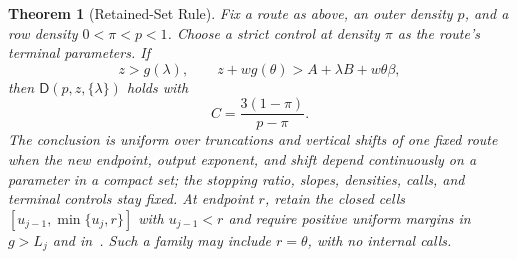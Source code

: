 \documentclass[10pt,a4paper]{amsart}
\newtheorem{theorem}{Theorem}
\newcommand{\DD}{\mathsf D}
\begin{document}
\begin{theorem}[Retained-Set Rule]\label{thm:route}
Fix a route as above, an outer density $p$, and a row density $0<\pi<p<1$.
Choose a strict control at density $\pi$ as the route's \emph{terminal parameters}.
If
\begin{equation}\label{eq:route-test}
 z>g(\lambda),\qquad
 z+w g(\theta)>A+\lambda B+w\theta\beta,
\end{equation}
then $\DD(p,z,\{\lambda\})$ holds with
\begin{equation}\label{eq:C}
 C=\frac{3(1-\pi)}{p-\pi}.
\end{equation}
The conclusion is uniform over truncations and vertical shifts of one fixed route when the new endpoint, output exponent, and shift depend continuously on a parameter in a compact set; the stopping ratio, slopes, densities, calls, and terminal controls stay fixed.
At endpoint $r$, retain the closed cells $[u_{j-1},\min\{u_j,r\}]$ with $u_{j-1}<r$ and require positive uniform margins in $g>L_j$ and in~.
Such a family may include $r=\theta$, with no internal calls.
\end{theorem}
\end{document}
